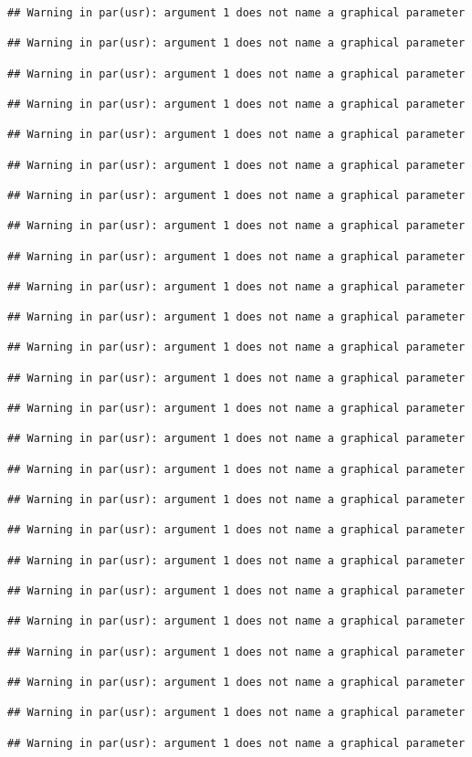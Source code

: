 \documentclass[
]{article}
\begin{document}
\begin{verbatim}
## Warning in par(usr): argument 1 does not name a graphical parameter

## Warning in par(usr): argument 1 does not name a graphical parameter

## Warning in par(usr): argument 1 does not name a graphical parameter

## Warning in par(usr): argument 1 does not name a graphical parameter

## Warning in par(usr): argument 1 does not name a graphical parameter

## Warning in par(usr): argument 1 does not name a graphical parameter

## Warning in par(usr): argument 1 does not name a graphical parameter

## Warning in par(usr): argument 1 does not name a graphical parameter

## Warning in par(usr): argument 1 does not name a graphical parameter

## Warning in par(usr): argument 1 does not name a graphical parameter

## Warning in par(usr): argument 1 does not name a graphical parameter

## Warning in par(usr): argument 1 does not name a graphical parameter

## Warning in par(usr): argument 1 does not name a graphical parameter

## Warning in par(usr): argument 1 does not name a graphical parameter

## Warning in par(usr): argument 1 does not name a graphical parameter

## Warning in par(usr): argument 1 does not name a graphical parameter

## Warning in par(usr): argument 1 does not name a graphical parameter

## Warning in par(usr): argument 1 does not name a graphical parameter

## Warning in par(usr): argument 1 does not name a graphical parameter

## Warning in par(usr): argument 1 does not name a graphical parameter

## Warning in par(usr): argument 1 does not name a graphical parameter

## Warning in par(usr): argument 1 does not name a graphical parameter

## Warning in par(usr): argument 1 does not name a graphical parameter

## Warning in par(usr): argument 1 does not name a graphical parameter

## Warning in par(usr): argument 1 does not name a graphical parameter
\end{verbatim}
\end{document}
